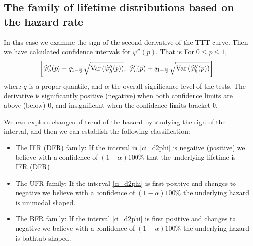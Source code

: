 \documentclass[preprint,12pt]{elsarticle}
\begin{document}
\subsection*{The family of lifetime distributions based on the hazard rate}
\noindent In this case we examine the sign of the second derivative of the TTT curve. Then we have calculated confidence intervals for $\varphi''(p)$. That is
For $0\leq p \leq 1$,
\begin{equation}\label{ci_d2phi}
\left[\widehat{\varphi}''_h(p)-q_{1-\frac{\alpha}{2}}\sqrt{{\rm Var}\left(\widehat{\varphi}''_h(p)\right)}, \ \widehat{\varphi}''_h(p)+q_{1-\frac{\alpha}{2}}\sqrt{{\rm Var}\left(\widehat{\varphi}''_h(p)\right)}\right]
\end{equation}
where $q$ is a proper quantile, and $\alpha$ the overall significance level of the tests. The derivative is significantly positive (negative) when both confidence limits are above (below) 0, and insignificant when the confidence limits bracket 0.

We can explore changes of trend of the hazard by studying the sign of the interval, and then we can establish the following classification:
\begin{itemize}
\item The IFR (DFR) family:
\noindent If the interval in \eqref{ci_d2phi} is negative (positive) we believe with a confidence of $(1-\alpha)100\%$ that the underlying lifetime is IFR (DFR)
\item The UFR family:
\noindent If the interval \eqref{ci_d2phi} is first positive and changes to negative we believe with a confidence of $(1-\alpha)100\%$  the underlying hazard is unimodal shaped.
\item The BFR family:
\noindent If the interval \eqref{ci_d2phi} is first positive and changes to negative we believe with a confidence of $(1-\alpha)100\%$  the underlying hazard is bathtub shaped.
\end{itemize}
\end{document}
